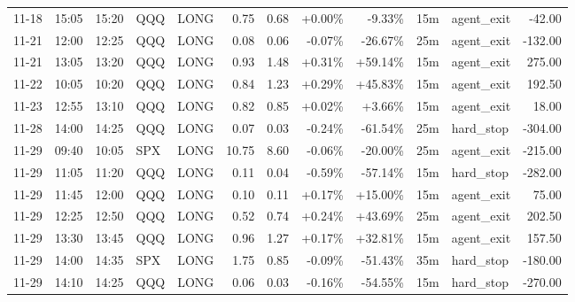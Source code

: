 \documentclass[11pt,a4paper]{article}
\begin{document}
\begin{center}
\begin{longtable}{>{\color{txtmain}}l l l l l r r r r r >{\color{txtmain}}l r}
11-18 & 15:05 & 15:20 & QQQ & LONG & 0.75 & 0.68 & \textcolor{wingreen}{+0.00\%} & \textcolor{lossred}{-9.33\%} & 15m & agent\_exit & \textcolor{lossred}{-42.00} \\
11-21 & 12:00 & 12:25 & QQQ & LONG & 0.08 & 0.06 & \textcolor{lossred}{-0.07\%} & \textcolor{lossred}{-26.67\%} & 25m & agent\_exit & \textcolor{lossred}{-132.00} \\
11-21 & 13:05 & 13:20 & QQQ & LONG & 0.93 & 1.48 & \textcolor{wingreen}{+0.31\%} & \textcolor{wingreen}{+59.14\%} & 15m & agent\_exit & \textcolor{wingreen}{275.00} \\
11-22 & 10:05 & 10:20 & QQQ & LONG & 0.84 & 1.23 & \textcolor{wingreen}{+0.29\%} & \textcolor{wingreen}{+45.83\%} & 15m & agent\_exit & \textcolor{wingreen}{192.50} \\
11-23 & 12:55 & 13:10 & QQQ & LONG & 0.82 & 0.85 & \textcolor{wingreen}{+0.02\%} & \textcolor{wingreen}{+3.66\%} & 15m & agent\_exit & \textcolor{wingreen}{18.00} \\
11-28 & 14:00 & 14:25 & QQQ & LONG & 0.07 & 0.03 & \textcolor{lossred}{-0.24\%} & \textcolor{lossred}{-61.54\%} & 25m & hard\_stop & \textcolor{lossred}{-304.00} \\
11-29 & 09:40 & 10:05 & SPX & LONG & 10.75 & 8.60 & \textcolor{lossred}{-0.06\%} & \textcolor{lossred}{-20.00\%} & 25m & agent\_exit & \textcolor{lossred}{-215.00} \\
11-29 & 11:05 & 11:20 & QQQ & LONG & 0.11 & 0.04 & \textcolor{lossred}{-0.59\%} & \textcolor{lossred}{-57.14\%} & 15m & hard\_stop & \textcolor{lossred}{-282.00} \\
11-29 & 11:45 & 12:00 & QQQ & LONG & 0.10 & 0.11 & \textcolor{wingreen}{+0.17\%} & \textcolor{wingreen}{+15.00\%} & 15m & agent\_exit & \textcolor{wingreen}{75.00} \\
11-29 & 12:25 & 12:50 & QQQ & LONG & 0.52 & 0.74 & \textcolor{wingreen}{+0.24\%} & \textcolor{wingreen}{+43.69\%} & 25m & agent\_exit & \textcolor{wingreen}{202.50} \\
11-29 & 13:30 & 13:45 & QQQ & LONG & 0.96 & 1.27 & \textcolor{wingreen}{+0.17\%} & \textcolor{wingreen}{+32.81\%} & 15m & agent\_exit & \textcolor{wingreen}{157.50} \\
11-29 & 14:00 & 14:35 & SPX & LONG & 1.75 & 0.85 & \textcolor{lossred}{-0.09\%} & \textcolor{lossred}{-51.43\%} & 35m & hard\_stop & \textcolor{lossred}{-180.00} \\
11-29 & 14:10 & 14:25 & QQQ & LONG & 0.06 & 0.03 & \textcolor{lossred}{-0.16\%} & \textcolor{lossred}{-54.55\%} & 15m & hard\_stop & \textcolor{lossred}{-270.00} \\

\end{longtable}
\end{center}
\end{document}
